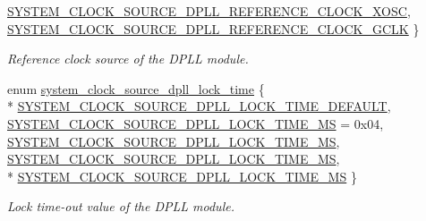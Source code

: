 \begin{DoxyCompactItemize}
\hyperlink{group__asfdoc__sam0__system__clock__group_gga835d71d0dc4437429d00c63226803630a11fe47185dd2d56032d954cdfa88d0b6}{S\+Y\+S\+T\+E\+M\+\_\+\+C\+L\+O\+C\+K\+\_\+\+S\+O\+U\+R\+C\+E\+\_\+\+D\+P\+L\+L\+\_\+\+R\+E\+F\+E\+R\+E\+N\+C\+E\+\_\+\+C\+L\+O\+C\+K\+\_\+\+X\+O\+S\+C}, 
\hyperlink{group__asfdoc__sam0__system__clock__group_gga835d71d0dc4437429d00c63226803630afda5d2058732750622331a93804ad1e1}{S\+Y\+S\+T\+E\+M\+\_\+\+C\+L\+O\+C\+K\+\_\+\+S\+O\+U\+R\+C\+E\+\_\+\+D\+P\+L\+L\+\_\+\+R\+E\+F\+E\+R\+E\+N\+C\+E\+\_\+\+C\+L\+O\+C\+K\+\_\+\+G\+C\+L\+K}
 \}
\begin{DoxyCompactList}\small\item\em Reference clock source of the D\+P\+L\+L module. \end{DoxyCompactList}\item 
enum \hyperlink{group__asfdoc__sam0__system__clock__group_ga0e7c19446d9be3e0f018db02e5dfd053}{system\+\_\+clock\+\_\+source\+\_\+dpll\+\_\+lock\+\_\+time} \{ \\*
\hyperlink{group__asfdoc__sam0__system__clock__group_gga0e7c19446d9be3e0f018db02e5dfd053ad0daeca5d71aa8e0744df0fcd1551d42}{S\+Y\+S\+T\+E\+M\+\_\+\+C\+L\+O\+C\+K\+\_\+\+S\+O\+U\+R\+C\+E\+\_\+\+D\+P\+L\+L\+\_\+\+L\+O\+C\+K\+\_\+\+T\+I\+M\+E\+\_\+\+D\+E\+F\+A\+U\+L\+T}, 
\hyperlink{group__asfdoc__sam0__system__clock__group_gga0e7c19446d9be3e0f018db02e5dfd053a17e54239fa3eb3b6b5f4498a7e38b093}{S\+Y\+S\+T\+E\+M\+\_\+\+C\+L\+O\+C\+K\+\_\+\+S\+O\+U\+R\+C\+E\+\_\+\+D\+P\+L\+L\+\_\+\+L\+O\+C\+K\+\_\+\+T\+I\+M\+E\+\_\+M\+S} = 0x04, 
\hyperlink{group__asfdoc__sam0__system__clock__group_gga0e7c19446d9be3e0f018db02e5dfd053ae382ded903d0f5e62034bff4b8969b42}{S\+Y\+S\+T\+E\+M\+\_\+\+C\+L\+O\+C\+K\+\_\+\+S\+O\+U\+R\+C\+E\+\_\+\+D\+P\+L\+L\+\_\+\+L\+O\+C\+K\+\_\+\+T\+I\+M\+E\+\_\+M\+S}, 
\hyperlink{group__asfdoc__sam0__system__clock__group_gga0e7c19446d9be3e0f018db02e5dfd053a271bc386a5d938287ace898f4390a47f}{S\+Y\+S\+T\+E\+M\+\_\+\+C\+L\+O\+C\+K\+\_\+\+S\+O\+U\+R\+C\+E\+\_\+\+D\+P\+L\+L\+\_\+\+L\+O\+C\+K\+\_\+\+T\+I\+M\+E\+\_\+M\+S}, 
\\*
\hyperlink{group__asfdoc__sam0__system__clock__group_gga0e7c19446d9be3e0f018db02e5dfd053a2de25682e0c649405ac97458ed0b19b9}{S\+Y\+S\+T\+E\+M\+\_\+\+C\+L\+O\+C\+K\+\_\+\+S\+O\+U\+R\+C\+E\+\_\+\+D\+P\+L\+L\+\_\+\+L\+O\+C\+K\+\_\+\+T\+I\+M\+E\+\_\+M\+S}
 \}
\begin{DoxyCompactList}\small\item\em Lock time-\/out value of the D\+P\+L\+L module. \end{DoxyCompactList}\item 

\end{DoxyCompactItemize}
